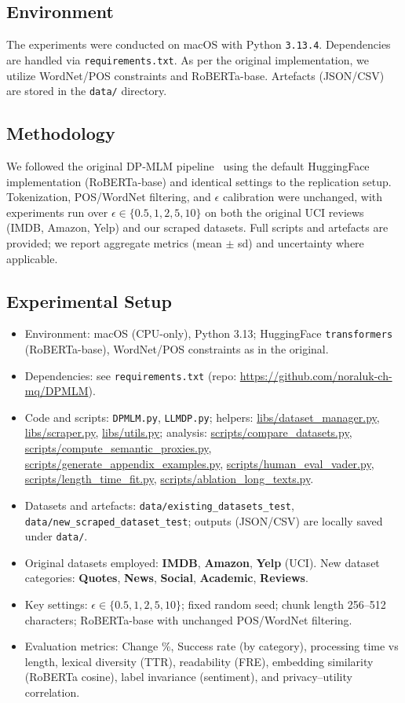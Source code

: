 \documentclass[11pt]{article}
\begin{document}
\subsection{Environment}
The experiments were conducted on macOS with Python \texttt{3.13.4}. Dependencies are handled via \texttt{requirements.txt}. As per the original implementation, we utilize WordNet/POS constraints and RoBERTa-base. Artefacts (JSON/CSV) are stored in the \texttt{data/} directory.

\subsection{Methodology}
We followed the original DP‑MLM pipeline~\cite{dpmlm} using the default HuggingFace implementation (RoBERTa‑base) and identical settings to the replication setup. Tokenization, POS/WordNet filtering, and $\epsilon$ calibration were unchanged, with experiments run over $\epsilon\in\{0.5,1,2,5,10\}$ on both the original UCI reviews (IMDB, Amazon, Yelp) and our scraped datasets. Full scripts and artefacts are provided; we report aggregate metrics (mean $\pm$ sd) and uncertainty where applicable.

\subsection{Experimental Setup}
\begin{itemize}[leftmargin=*]
  \item Environment: macOS (CPU-only), Python 3.13; HuggingFace \texttt{transformers} (RoBERTa-base), WordNet/POS constraints as in the original.
  \item Dependencies: see \texttt{requirements.txt} (repo: \url{https://github.com/noraluk-ch-mq/DPMLM}).
  \item Code and scripts: \texttt{DPMLM.py}, \texttt{LLMDP.py}; helpers: \url{libs/dataset_manager.py}, \url{libs/scraper.py}, \url{libs/utils.py}; analysis: \url{scripts/compare_datasets.py}, \url{scripts/compute_semantic_proxies.py}, \url{scripts/generate_appendix_examples.py}, \url{scripts/human_eval_vader.py}, \url{scripts/length_time_fit.py}, \url{scripts/ablation_long_texts.py}.
  \item Datasets and artefacts: \texttt{data/existing\_datasets\_test}, \texttt{data/new\_scraped\_dataset\_test}; outputs (JSON/CSV) are locally saved under \texttt{data/}.
  \item Original datasets employed: \textbf{IMDB}, \textbf{Amazon}, \textbf{Yelp} (UCI). New dataset categories: \textbf{Quotes}, \textbf{News}, \textbf{Social}, \textbf{Academic}, \textbf{Reviews}.
  \item Key settings: $\epsilon \in \{0.5,1,2,5,10\}$; fixed random seed; chunk length 256--512 characters; RoBERTa-base with unchanged POS/WordNet filtering.
  \item Evaluation metrics: Change \%, Success rate (by category), processing time vs length, lexical diversity (TTR), readability (FRE), embedding similarity (RoBERTa cosine), label invariance (sentiment), and privacy--utility correlation.
\end{itemize}
\end{document}
